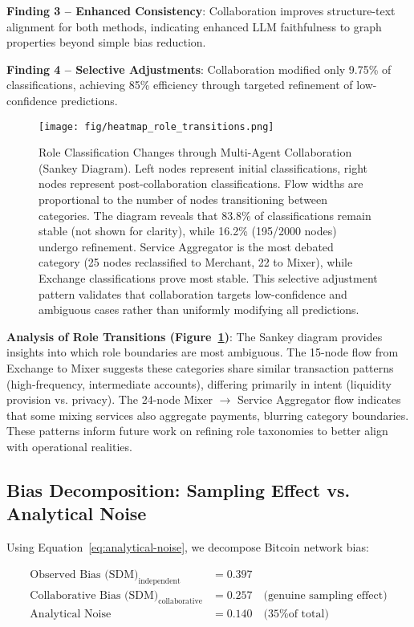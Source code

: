 \documentclass[conference]{IEEEtran}
\begin{document}
\textbf{Finding 3 -- Enhanced Consistency}: Collaboration improves structure-text alignment for both methods, indicating enhanced LLM faithfulness to graph properties beyond simple bias reduction.

\textbf{Finding 4 -- Selective Adjustments}: Collaboration modified only 9.75\% of classifications, achieving 85\% efficiency through targeted refinement of low-confidence predictions.

\begin{figure}[htbp]
    \centering
    \texttt{[image: fig/heatmap\_role\_transitions.png]}
    \caption{Role Classification Changes through Multi-Agent Collaboration (Sankey Diagram). Left nodes represent initial classifications, right nodes represent post-collaboration classifications. Flow widths are proportional to the number of nodes transitioning between categories. The diagram reveals that 83.8\% of classifications remain stable (not shown for clarity), while 16.2\% (195/2000 nodes) undergo refinement. Service Aggregator is the most debated category (25 nodes reclassified to Merchant, 22 to Mixer), while Exchange classifications prove most stable. This selective adjustment pattern validates that collaboration targets low-confidence and ambiguous cases rather than uniformly modifying all predictions.}
    \label{fig:role-transitions}
\end{figure}

\textbf{Analysis of Role Transitions (Figure~\ref{fig:role-transitions})}: The Sankey diagram provides insights into which role boundaries are most ambiguous. The 15-node flow from Exchange to Mixer suggests these categories share similar transaction patterns (high-frequency, intermediate accounts), differing primarily in intent (liquidity provision vs. privacy). The 24-node Mixer $\rightarrow$ Service Aggregator flow indicates that some mixing services also aggregate payments, blurring category boundaries. These patterns inform future work on refining role taxonomies to better align with operational realities.

\subsection{Bias Decomposition: Sampling Effect vs. Analytical Noise}

Using Equation~\ref{eq:analytical-noise}, we decompose Bitcoin network bias:

\begin{align}
\text{Observed Bias (SDM)}_{\text{independent}} &= 0.397 \\
\text{Collaborative Bias (SDM)}_{\text{collaborative}} &= 0.257 \quad \text{(genuine sampling effect)} \\
\text{Analytical Noise} &= 0.140 \quad \text{(35\% of total)}
\end{align}
\end{document}
